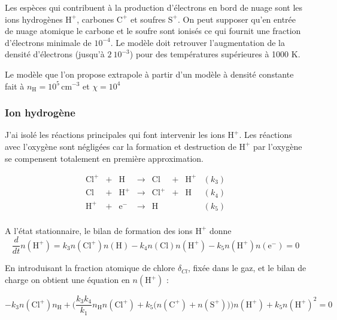Les espèces qui contribuent à la production d'électrons en bord de nuage sont les ions hydrogènes $\mathrm{H}^+$, carbones $\mathrm{C}^+$ et soufres $\mathrm{S}^+$. On peut supposer qu'en entrée de nuage atomique le carbone et le soufre sont ionisés ce qui fournit une fraction d'électrons minimale de $10^{-4}$. Le modèle doit retrouver l'augmentation de la densité d'électrons (jusqu'à $2\ 10^{-3}$) pour des températures supérieures à 1000 K. \newline 

Le modèle que l'on propose extrapole à partir d'un modèle à densité constante fait à $n_\mathrm{H} = 10^5 \, \mathrm{cm}^{-3}$ et $\chi = 10^4$


\subsubsection{Ion hydrogène}

J'ai isolé les réactions principales qui font intervenir les ions $\mathrm{H}^+$. Les réactions avec l'oxygène sont négligées car la formation et destruction de $\mathrm{H}^+$ par l'oxygène se compensent totalement en première approximation. 

\begin{equation}
    \begin{array}{lccccclr}
        \mathrm{Cl}^+ & + &\mathrm{H}   & \rightarrow &\mathrm{Cl}  & + & \mathrm{H}^+ & (k_3) \\
        \mathrm{Cl}  & + & \mathrm{H}^+  & \rightarrow & \mathrm{Cl}^+ & + &\mathrm{H}  & (k_4) \\
        \mathrm{H}^+  & + & \mathrm{e}^-  & \rightarrow &\mathrm{H}   &   &     & (k_5) \\
    \end{array}
\end{equation}

A l'état stationnaire, le bilan de formation des ions $\mathrm{H}^+$ donne
\begin{equation}\label{eq:h+}
    \frac{d}{dt}n(\mathrm{H}^+) = k_3n(\mathrm{Cl}^+)n(\mathrm{H}) - k_4n(\mathrm{Cl})n(\mathrm{H}^+) - k_5 n(\mathrm{H}^+)n(\mathrm{e}^-) = 0
\end{equation}

En introduisant la fraction atomique de chlore $\delta_{Cl}$, fixée dans le gaz, et le bilan de charge on obtient une équation en $n(\mathrm{H}^+)$ :

\begin{equation}
    -k_3n(\mathrm{Cl}^+)n_{\mathrm{H}} + \bigg( \frac{k_3 k_4}{k_1} n_{\mathrm{H}} n(\mathrm{Cl}^+) + k_5 \big(n(\mathrm{C}^+)+ n(\mathrm{S}^+)\big) \bigg) n(\mathrm{H}^+) + k_5 n(\mathrm{H}^+)^2 = 0
\end{equation}

